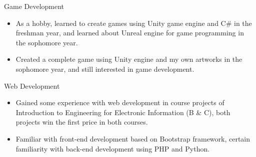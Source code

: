 \begin{cvskills}
\vspace{0.8em}
  \cvskill
  {Game Development}
  {
    \hspace{-2.5em}
    \begin{minipage}{0.94\linewidth}
      \begin{itemize}
        \item As a hobby, learned to create games using Unity game engine and C\# in the freshman year, and learned about Unreal engine for game programming in the sophomore year.
        \item Created a complete game using Unity engine and my own artworks in the sophomore year, and still interested in game development.
      \end{itemize}
    \end{minipage}
  }

\vspace{0.8em}
  \cvskill
  {Web Development}
  {
    \hspace{-2.5em}
    \begin{minipage}{0.94\linewidth}
      \begin{itemize}
        \item Gained some experience with web development in course projects of Introduction to Engineering for Electronic Information (B \& C), both projects win the first price in both courses.
        \item Familiar with front-end development based on Bootstrap framework, certain familiarity with back-end development using PHP and Python.
      \end{itemize}
    \end{minipage}
  }

\end{cvskills}
